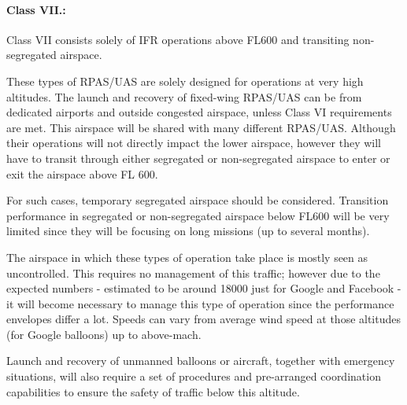 \paragraph{Class VII.:} Class VII consists solely of IFR operations above FL600 and transiting non-segregated airspace.
    
    These types of RPAS/UAS are solely designed for operations at very high altitudes. The launch and recovery of fixed-wing RPAS/UAS can be from dedicated airports and outside congested airspace, unless Class VI requirements are met. This airspace will be shared with many different RPAS/UAS. Although their operations will not directly impact the lower airspace, however they will have to transit through either segregated or non-segregated airspace to enter or exit the airspace above FL 600.
    
    For such cases, temporary segregated airspace should be considered. Transition performance in segregated or non-segregated airspace below FL600 will be very limited since they will be focusing on long missions (up to several months).

    The airspace in which these types of operation take place is mostly seen as uncontrolled. This requires no management of this traffic; however due to the expected numbers - estimated to be around 18000 just for Google and Facebook - it will become necessary to manage this type of operation since the performance envelopes differ a lot. Speeds can vary from average wind speed at those altitudes (for Google balloons) up to above-mach.

    Launch and recovery of unmanned balloons or aircraft, together with emergency situations, will also require a set of procedures and pre-arranged coordination capabilities to ensure the safety of traffic below this altitude.


